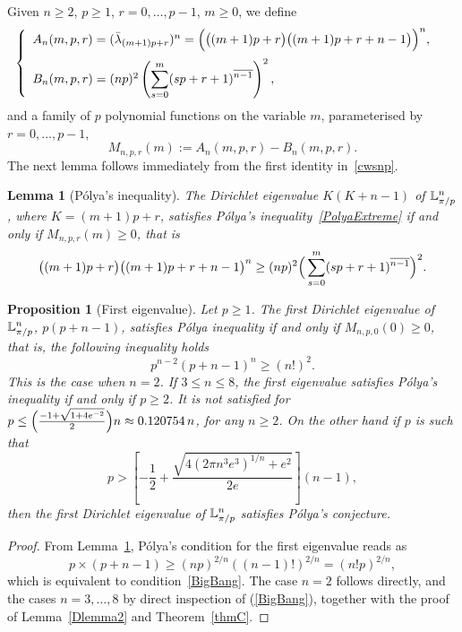 \documentclass[11pt,a4paper,times]{amsart}
\theoremstyle{plain}
\newtheorem{lemma}[thm]{Lemma}
\newtheorem{proposition}{Proposition}[section]
\theoremstyle{definition}
\numberwithin{equation}{section}
\newcommand{\ds}{\displaystyle}
\newcommand{\dsum}{\ds\sum}
\newcommand{\eqskip}{ \vspace*{2mm}\\ }
\newcommand{\fr}[2]{\frac{\ds #1}{\ds #2}}
\newcommand{\luned}[2]{\raisebox{0.5pt}{${}$}\mathbb{L}^{#1}_{\pi/#2}}
\newcommand{\txtg}{\textcolor{green}}
\begin{document}
{Given $n\geq 2$, $p\geq 1$, $r=0,\ldots, p-1$, $m\geq 0$, we define
\begin{gather*} 
\left\{\begin{array}{ll}
A_n(m,p,r)=(\bar{\lambda}_{(m+1)p+r})^n=\Big{(}\big{(}(m+1)p+r\big{)}\big{(}(m+1)p+r+n-1\big{)}\Big{)}^{n}, \quad  \eqskip
B_n(m,p,r)= (np)^2\left(\dsum_{s=0}^m(sp+r+1)^{\overline{n-1}}\right)^2,
\end{array}\right.
\end{gather*}
and a family of $p$ polynomial functions on the variable $m$, parameterised by $r=0, \ldots, p-1$,
 \begin{equation}\label{M}
M_{n,p,r}(m):=A_n(m,p,r)-B_n(m,p,r).
\end{equation}
The next lemma follows immediately from the first identity in~\eqref{cwsnp}.
%
\begin{lemma}[P\'{o}lya's inequality] \label{3.4} The Dirichlet eigenvalue $K(K+n-1)$ of $\luned{n}{p}$, where  $K=(m+1)p+r$,
satisfies P\'{o}lya's inequality~\eqref{PolyaExtreme} if and only if $M_{n,p,r}(m)\geq 0$, that is
%
\begin{equation}\label{polyanp}
\big{(}(m+1)p+r\big{)}\big{(}(m+1)p+r+n-1\big{)}^{ n}\geq (np)^2\Big{(}\sum_{s=0}^m(sp+r+1)^{\overline{n-1}}\Big{)}^2.
\end{equation}
\end{lemma}
%
\begin{proposition} [First eigenvalue] \label{First}
Let {$p\geq 1$}. The first Dirichlet eigenvalue of $\luned{n}{p}$, $p(p+n-1)$,  satisfies P\'{o}lya  inequality  if and only if  $M_{n,p,0}(0)\geq 0$,
that is, the following inequality holds
\begin{equation}\label{BigBang}
 p^{n-2}(p+n-1)^n\geq (n!)^2. 
 \end{equation}
 This is the case when $n=2$. If $3\leq n\leq 8$, the first eigenvalue satisfies P\'{o}lya's inequality
 if and only if $p\geq 2$.  It is not
 satisfied for $p\leq  \Big{(}\frac{-1+\sqrt{1+4 e^{-2}}}{2}\Big{)} n \approx 0.120754 \, n$, for any $n\geq 2$.
 On the other hand if $p$ is such that
 \begin{equation}\label{firstyes}
  p > \left[ -\fr{1}{2} +\fr{\sqrt{4(2\pi n^3 e^3)^{1/n}+e^2}}{2e}\right] (n-1),
 \end{equation}
 then the first Dirichlet eigenvalue of $\luned{n}{p}$ satisfies P\'{o}lya's conjecture.
\end{proposition}
%
\begin{proof}
 From  Lemma~\ref{3.4}, P\'{o}lya's condition for the first eigenvalue reads as
\[ p\times (p+n-1)\geq (np)^{2/n}((n-1)!)^{2/n} = (n!p)^{2/n},\]
which is equivalent to condition~\eqref{BigBang}.
The case $n=2$ follows directly, and the cases $n=3, \ldots, 8 $  by direct inspection of (\ref{BigBang}), together with the proof of Lemma~\ref{Dlemma2} and Theorem~\ref{thmC}.
 

\end{proof}}
\end{document}
